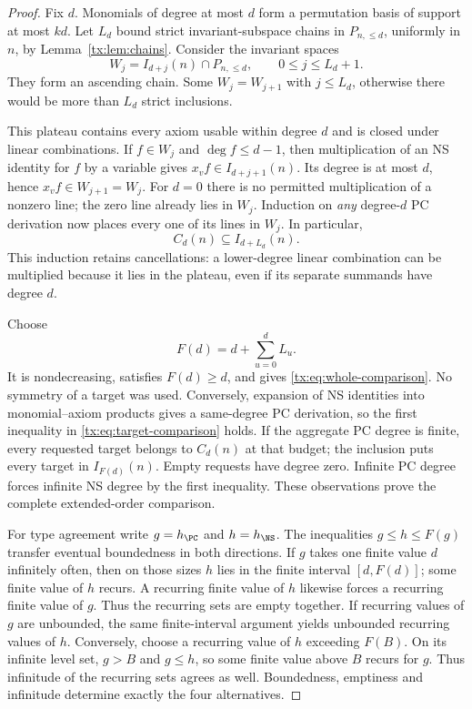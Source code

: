 \begin{proof}
Fix $d$. Monomials of degree at most $d$ form a permutation basis of
support at most $kd$. Let $L_d$ bound strict invariant-subspace chains in
$P_{n,\le d}$, uniformly in $n$, by Lemma~\ref{tx:lem:chains}.
Consider the invariant spaces
\[
              W_j=I_{d+j}(n)\cap P_{n,\le d},
                    \qquad 0\le j\le L_d+1.
\]
They form an ascending chain. Some $W_j=W_{j+1}$ with $j\le L_d$,
otherwise there would be more than $L_d$ strict inclusions.

This plateau contains every axiom usable within degree $d$ and is closed
under linear combinations. If $f\in W_j$ and $\deg f\le d-1$, then
multiplication of an NS identity for $f$ by a variable gives
$x_vf\in I_{d+j+1}(n)$. Its degree is at most $d$, hence
$x_vf\in W_{j+1}=W_j$. For $d=0$ there is no permitted multiplication
of a nonzero line; the zero line already lies in $W_j$.
Induction on \emph{any} degree-$d$ PC derivation now places every one of
its lines in $W_j$. In particular,
\[
                          C_d(n)\subseteq I_{d+L_d}(n).
\]
This induction retains cancellations: a lower-degree linear combination
can be multiplied because it lies in the plateau, even if its separate
summands have degree $d$.

Choose
\[
                          F(d)=d+\sum_{u=0}^d L_u.
\]
It is nondecreasing, satisfies $F(d)\ge d$, and gives
\eqref{tx:eq:whole-comparison}. No symmetry of a target was used.
Conversely, expansion of NS identities into monomial--axiom products
gives a same-degree PC derivation, so the first inequality in
\eqref{tx:eq:target-comparison} holds. If the aggregate PC degree is finite,
every requested target belongs to $C_d(n)$ at that budget; the inclusion
puts every target in $I_{F(d)}(n)$. Empty requests have degree zero.
Infinite PC degree forces infinite NS degree by the first inequality.
These observations prove the complete extended-order comparison.

For type agreement write $g=h_{\PC}$ and $h=h_{\NS}$.
The inequalities $g\le h\le F(g)$ transfer eventual boundedness in both
directions. If $g$ takes one finite value $d$ infinitely often, then on
those sizes $h$ lies in the finite interval $[d,F(d)]$; some finite value
of $h$ recurs. A recurring finite value of $h$ likewise forces a recurring
finite value of $g$. Thus the recurring sets are empty together.
If recurring values of $g$ are unbounded, the same finite-interval
argument yields unbounded recurring values of $h$. Conversely, choose a
recurring value of $h$ exceeding $F(B)$. On its infinite level set,
$g>B$ and $g\le h$, so some finite value above $B$ recurs for $g$.
Thus infinitude of the recurring sets agrees as well. Boundedness,
emptiness and infinitude determine exactly the four alternatives.
\end{proof}

